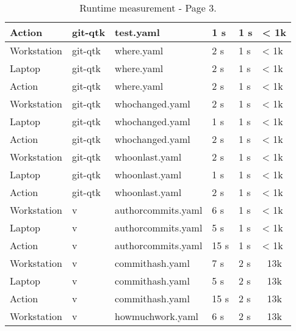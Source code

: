 \begin{table}[H]
\begin{tabular}{ | m{} | m{} | m{} | m{} | m{} | m{} | }
		\hline
		Action & git-qtk & test.yaml & 1 s & 1 s & < 1k \\ 
		\hline
		Workstation & git-qtk & where.yaml & 2 s & 1 s & < 1k \\ 
		\hline
		Laptop & git-qtk & where.yaml & 2 s & 1 s & < 1k \\ 
		\hline
		Action & git-qtk & where.yaml & 2 s & 1 s & < 1k \\ 
		\hline
		Workstation & git-qtk & whochanged.yaml & 2 s & 1 s & < 1k \\ 
		\hline
		Laptop & git-qtk & whochanged.yaml & 1 s & 1 s & < 1k \\ 
		\hline
		Action & git-qtk & whochanged.yaml & 2 s & 1 s & < 1k \\ 
		\hline
		Workstation & git-qtk & whoonlast.yaml & 2 s & 1 s & < 1k \\ 
		\hline
		Laptop & git-qtk & whoonlast.yaml & 1 s & 1 s & < 1k \\ 
		\hline
		Action & git-qtk & whoonlast.yaml & 2 s & 1 s & < 1k \\ 
		\hline
		Workstation & v & authorcommits.yaml & 6 s & 1 s & < 1k \\ 
		\hline
		Laptop & v & authorcommits.yaml & 5 s & 1 s & < 1k \\ 
		\hline
		Action & v & authorcommits.yaml & 15 s & 1 s & < 1k \\ 
		\hline
		Workstation & v & commithash.yaml & 7 s & 2 s & ~13k \\ 
		\hline
		Laptop & v & commithash.yaml & 5 s & 2 s & ~13k \\ 
		\hline
		Action & v & commithash.yaml & 15 s & 2 s & ~13k \\ 
		\hline
		Workstation & v & howmuchwork.yaml & 6 s & 2 s & ~13k \\ 
		\hline
	\end{tabular}
	\caption{Runtime measurement - Page 3.}
	\label{tab:mes-4}
\end{table}

